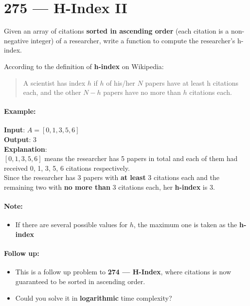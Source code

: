 \section{275 --- H-Index II}
Given an array of citations \textbf{sorted in ascending order} (each citation is a non-negative integer) of a researcher, write a function to compute the researcher's h-index.
\par
According to the definition of \textbf{h-index} on Wikipedia:
\begin{quote}
 A scientist has index $h$ if $h$ of his/her $N$ papers have at least h citations each, and the other $N - h$ papers have no more than $h$ citations each.
\end{quote}

\paragraph{Example:}

\begin{flushleft}
\textbf{Input}: $A = [0,1,3,5,6]$
\\
\textbf{Output}: 3 
\\
\textbf{Explanation}: 
\\
$[0,1,3,5,6]$ means the researcher has 5 papers in total and each of them had received 0, 1, 3, 5, 6 citations respectively. 
\\
Since the researcher has 3 papers with \textbf{at least} 3 citations each and the remaining two with \textbf{no more than} 3 citations each, her \textbf{h-index} is 3.
\end{flushleft}
\paragraph{Note:} 
\begin{itemize}
\item If there are several possible values for $h$, the maximum one is taken as the \textbf{h-index}
\end{itemize}

\paragraph{Follow up:}

\begin{itemize}
\item This is a follow up problem to \textbf{274 --- H-Index}, where citations is now guaranteed to be sorted in ascending order.
\item Could you solve it in \textbf{logarithmic} time complexity?
\end{itemize}
